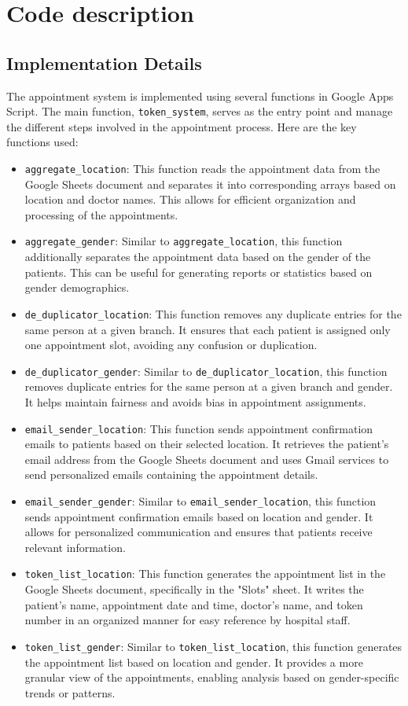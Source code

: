 \documentclass{report}
\begin{document}
\chapter{Code description}
\section{Implementation Details}
The appointment system is implemented using several functions in Google Apps Script. The main function, \texttt{token\_system}, serves as the entry point and manage the different steps involved in the appointment process. Here are the key functions used:

\begin{itemize}
    \item \texttt{aggregate\_location}: This function reads the appointment data from the Google Sheets document and separates it into corresponding arrays based on location and doctor names. This allows for efficient organization and processing of the appointments.
    \item \texttt{aggregate\_gender}: Similar to \texttt{aggregate\_location}, this function additionally separates the appointment data based on the gender of the patients. This can be useful for generating reports or statistics based on gender demographics.
    \item \texttt{de\_duplicator\_location}: This function removes any duplicate entries for the same person at a given branch. It ensures that each patient is assigned only one appointment slot, avoiding any confusion or duplication.
    \item \texttt{de\_duplicator\_gender}: Similar to \texttt{de\_duplicator\_location}, this function removes duplicate entries for the same person at a given branch and gender. It helps maintain fairness and avoids bias in appointment assignments.
    \item \texttt{email\_sender\_location}: This function sends appointment confirmation emails to patients based on their selected location. It retrieves the patient's email address from the Google Sheets document and uses Gmail services to send personalized emails containing the appointment details.
    \item \texttt{email\_sender\_gender}: Similar to \texttt{email\_sender\_location}, this function sends appointment confirmation emails based on location and gender. It allows for personalized communication and ensures that patients receive relevant information.
    \item \texttt{token\_list\_location}: This function generates the appointment list in the Google Sheets document, specifically in the "Slots" sheet. It writes the patient's name, appointment date and time, doctor's name, and token number in an organized manner for easy reference by hospital staff.
    \item \texttt{token\_list\_gender}: Similar to \texttt{token\_list\_location}, this function generates the appointment list based on location and gender. It provides a more granular view of the appointments, enabling analysis based on gender-specific trends or patterns.
\end{itemize}
\end{document}
